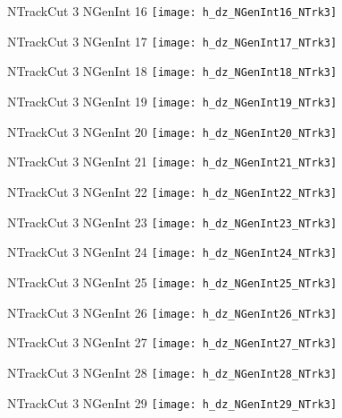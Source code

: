 \documentclass[8pt]{beamer}
\begin{document}
\begin{frame}
\center
\large{NTrackCut 3 NGenInt 16}
\texttt{[image: h\_dz\_NGenInt16\_NTrk3]}
\end{frame}
\begin{frame}
\center
\large{NTrackCut 3 NGenInt 17}
\texttt{[image: h\_dz\_NGenInt17\_NTrk3]}
\end{frame}
\begin{frame}
\center
\large{NTrackCut 3 NGenInt 18}
\texttt{[image: h\_dz\_NGenInt18\_NTrk3]}
\end{frame}
\begin{frame}
\center
\large{NTrackCut 3 NGenInt 19}
\texttt{[image: h\_dz\_NGenInt19\_NTrk3]}
\end{frame}
\begin{frame}
\center
\large{NTrackCut 3 NGenInt 20}
\texttt{[image: h\_dz\_NGenInt20\_NTrk3]}
\end{frame}
\begin{frame}
\center
\large{NTrackCut 3 NGenInt 21}
\texttt{[image: h\_dz\_NGenInt21\_NTrk3]}
\end{frame}
\begin{frame}
\center
\large{NTrackCut 3 NGenInt 22}
\texttt{[image: h\_dz\_NGenInt22\_NTrk3]}
\end{frame}
\begin{frame}
\center
\large{NTrackCut 3 NGenInt 23}
\texttt{[image: h\_dz\_NGenInt23\_NTrk3]}
\end{frame}
\begin{frame}
\center
\large{NTrackCut 3 NGenInt 24}
\texttt{[image: h\_dz\_NGenInt24\_NTrk3]}
\end{frame}
\begin{frame}
\center
\large{NTrackCut 3 NGenInt 25}
\texttt{[image: h\_dz\_NGenInt25\_NTrk3]}
\end{frame}
\begin{frame}
\center
\large{NTrackCut 3 NGenInt 26}
\texttt{[image: h\_dz\_NGenInt26\_NTrk3]}
\end{frame}
\begin{frame}
\center
\large{NTrackCut 3 NGenInt 27}
\texttt{[image: h\_dz\_NGenInt27\_NTrk3]}
\end{frame}
\begin{frame}
\center
\large{NTrackCut 3 NGenInt 28}
\texttt{[image: h\_dz\_NGenInt28\_NTrk3]}
\end{frame}
\begin{frame}
\center
\large{NTrackCut 3 NGenInt 29}
\texttt{[image: h\_dz\_NGenInt29\_NTrk3]}
\end{frame}
\end{document}
